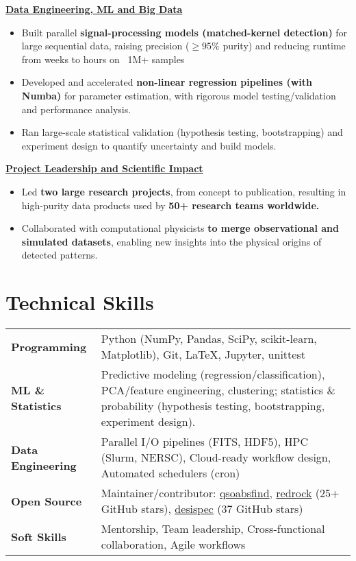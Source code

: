 \documentclass[a4paper,10pt]{article}
\begin{document}
\vspace{2mm}
\begin{adjustwidth}{1em}{0pt}

\textcolor{sectionblue}{\textbf{\underline{Data Engineering, ML and Big Data}}}
\begin{itemize}[leftmargin=*, itemsep=2pt]
    \item Built parallel \textbf{signal-processing models (matched-kernel detection)} for large sequential data, raising precision ($\geq95\%$ purity) and reducing runtime from weeks to hours on ~1M+ samples
    \item Developed and accelerated \textbf{non-linear regression pipelines (with Numba)} for parameter estimation, with rigorous model testing/validation and performance analysis.
    \item Ran large-scale statistical validation (hypothesis testing, bootstrapping) and experiment design to quantify uncertainty and build models.
\end{itemize}

\vspace{2pt}
\textcolor{sectionblue}{\textbf{\underline{Project Leadership and Scientific Impact}}}
\begin{itemize}[leftmargin=*, itemsep=2pt]
   \item Led \textbf{two large research projects}, from concept to publication, resulting in high-purity data products used by \textbf{50+ research teams worldwide.}
    \item Collaborated with computational physicists \textbf{to merge observational and simulated datasets}, enabling new insights into the physical origins of detected patterns.
    \end{itemize}
\end{adjustwidth}
\vspace*{-4.5mm}

\section*{Technical Skills}
\begin{tabular}{p{3cm} p{13cm}}
\textbf{Programming} & Python (NumPy, Pandas, SciPy, scikit-learn, Matplotlib), Git, LaTeX, Jupyter, unittest \\
\textbf{ML \& Statistics} & Predictive modeling (regression/classification), PCA/feature engineering, clustering; statistics \& probability (hypothesis testing, bootstrapping, experiment design). \\
\textbf{Data Engineering} & Parallel I/O pipelines (FITS, HDF5), HPC (Slurm, NERSC), Cloud-ready workflow design, Automated schedulers (cron) \\
\textbf{Open Source} & Maintainer/contributor: \href{https://github.com/abhi0395/qsoabsfind}{qsoabsfind}, \href{https://github.com/desihub/redrock}{redrock} (25+ GitHub stars), \href{https://github.com/desihub/desispec}{desispec} (37 GitHub stars) \\
\textbf{Soft Skills} & Mentorship, Team leadership, Cross-functional collaboration, Agile workflows
\end{tabular}
\end{document}
